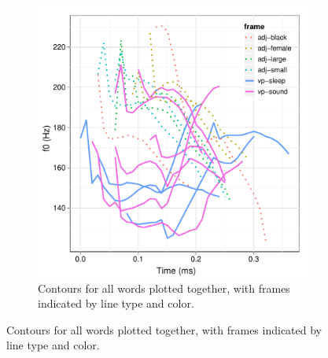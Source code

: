 \documentclass[12pt]{article}
\begin{document}
\begin{figure}[h]
  \centering
  \begin{subfigure}[t]{0.5\textwidth}
    \centering
    \includegraphics[width=\textwidth]{kiy-20111208-plot-targets-niso-mess}%
    \caption{Contours for all words plotted together, with frames
      indicated by line type and color.}
    \label{fig:plot-targets-mess}
  \end{subfigure}


\end{figure}
\end{document}

